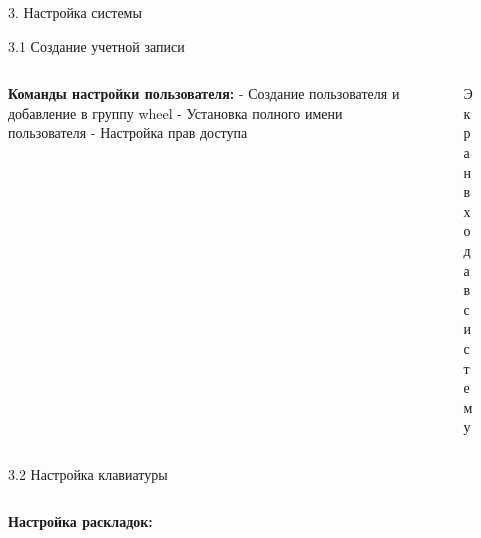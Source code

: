 \documentclass[
  ignorenonframetext,
  aspectratio=169,
  russian,
]{beamer}
\begin{document}
\begin{frame}[fragile]{3. Настройка системы}
\label{ux43dux430ux441ux442ux440ux43eux439ux43aux430-ux441ux438ux441ux442ux435ux43cux44b}
\begin{block}{3.1 Создание учетной записи}
\label{ux441ux43eux437ux434ux430ux43dux438ux435-ux443ux447ux435ux442ux43dux43eux439-ux437ux430ux43fux438ux441ux438}
\begin{columns}[c]
\begin{column}{0.7\linewidth}
\textbf{Команды настройки пользователя:} - Создание пользователя и
добавление в группу wheel - Установка полного имени пользователя -
Настройка прав доступа
\end{column}

\begin{column}{0.3\linewidth}
\begin{figure}


\caption{\label{fig-signin}Экран входа в систему}

\end{figure}%
\end{column}
\end{columns}
\end{block}

\begin{block}{3.2 Настройка клавиатуры}
\label{ux43dux430ux441ux442ux440ux43eux439ux43aux430-ux43aux43bux430ux432ux438ux430ux442ux443ux440ux44b}
\begin{columns}[c]
\begin{column}{0.7\linewidth}
\textbf{Настройка раскладок:}
\end{column}


\end{columns}
\end{block}
\end{frame}
\end{document}

